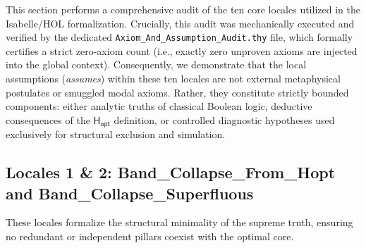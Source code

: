 \documentclass[a4paper, 11pt]{article}
\theoremstyle{plain}
\theoremstyle{definition}
\newcommand{\Hopt}{\mathsf{H_{opt}}}       %
\begin{document}
This section performs a comprehensive audit of the ten core locales utilized in the Isabelle/HOL formalization. Crucially, this audit was mechanically executed and verified by the dedicated \texttt{Axiom\_And\_Assumption\_Audit.thy} file, which formally certifies a strict zero-axiom count (i.e., exactly zero unproven axioms are injected into the global context). Consequently, we demonstrate that the local assumptions (\textit{assumes}) within these ten locales are not external metaphysical postulates or smuggled modal axioms. Rather, they constitute strictly bounded components: either analytic truths of classical Boolean logic, deductive consequences of the \(\Hopt\) definition, or controlled diagnostic hypotheses used exclusively for structural exclusion and simulation.

\subsection{Locales 1 \& 2: Band\_Collapse\_From\_Hopt and Band\_Collapse\_Superfluous}
These locales formalize the structural minimality of the supreme truth, ensuring no redundant or independent pillars coexist with the optimal core.
\end{document}
